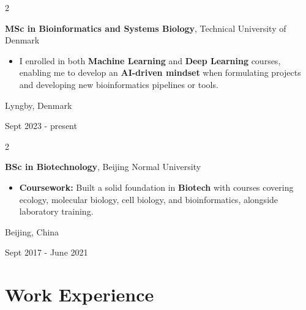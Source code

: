 \documentclass[10pt, letterpaper]{article}
\newenvironment{highlights}{
    \begin{itemize}[
        topsep=0.10 cm,
        parsep=0.10 cm,
        partopsep=0pt,
        itemsep=0pt,
        leftmargin=0.4 cm + 10pt
    ]
}{
    \end{itemize}
} %
\newenvironment{twocolentry}[2][]{
    \onecolentry
    \def\secondColumn{#2}
    \setcolumnwidth{\fill, 4.5 cm}
    \begin{paracol}{2}
}{
    \switchcolumn \raggedleft \secondColumn
    \end{paracol}
    \endonecolentry
} %
\begin{document}
        
        \begin{twocolentry}{
    Lyngby, Denmark

    Sept 2023 - present
}
    \textbf{MSc in Bioinformatics and Systems Biology}, Technical University of Denmark
    \begin{highlights}
        \item I enrolled in both \textbf{Machine Learning} and \textbf{Deep Learning} courses, enabling me to develop an \textbf{AI-driven mindset} when formulating projects and developing new bioinformatics pipelines or tools. 
    \end{highlights}
\end{twocolentry}


        \vspace{0.3 cm}

\begin{twocolentry}{
    Beijing, China
    
    Sept 2017 - June 2021
}
    \textbf{BSc in Biotechnology}, Beijing Normal University
    \begin{highlights}
        \item \textbf{Coursework:} Built a solid foundation in \textbf{Biotech} with courses covering ecology, molecular biology, cell biology, and bioinformatics, alongside laboratory training.
    \end{highlights}
\end{twocolentry}


    
    \section{Work Experience}
\end{document}
